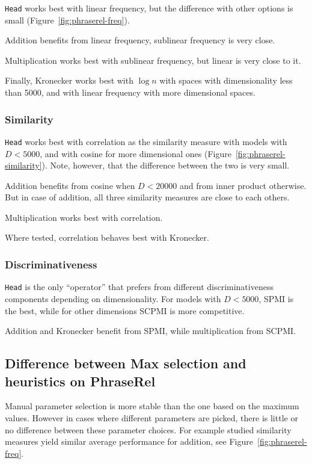 \texttt{Head} works best with linear frequency, but the difference with other options is small (Figure~\ref{fig:phraserel-freq}).

Addition benefits from linear frequency, sublinear frequency is very close.

Multiplication works best with sublinear frequency, but linear is very close to it.

Finally, Kronecker works best with $\log n$ with spaces with dimensionality less than 5000, and with linear frequency with more dimensional spaces.

\subsubsection{Similarity}
\label{sec:similarity-phraserel}

\texttt{Head} works best with correlation as the similarity measure with models with $D < 5000$, and with cosine for more dimensional ones (Figure~\ref{fig:phraserel-similarity}). Note, however, that the difference between the two is very small.

Addition benefits from cosine when $D < 20000$ and from inner product otherwise. But in case of addition, all three similarity measures are close to each others.

Multiplication works best with correlation.

Where tested, correlation behaves best with Kronecker.

\subsubsection{Discriminativeness}
\label{sec:discriminativeness-phraserel}



\texttt{Head} is the only ``operator'' that prefers from different discriminativeness components depending on dimensionality. For models with $D < 5000$, SPMI is the best, while for other dimensions SCPMI is more competitive.

Addition and Kronecker benefit from SPMI, while multiplication from SCPMI.

\subsection{Difference between Max selection and heuristics on PhraseRel}
\label{sec:diff-phraserel}

Manual parameter selection is more stable than the one based on the maximum values. However in cases where different parameters are picked, there is little or no difference between these parameter choices. For example studied similarity measures yield similar average performance for addition, see Figure~\ref{fig:phraserel-freq}.

